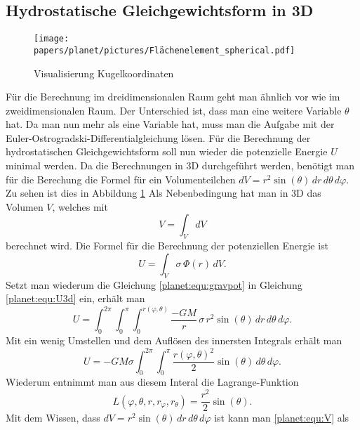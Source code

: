 \subsection{Hydrostatische Gleichgewichtsform in 3D}
\begin{figure}
	\centering
	\texttt{[image: papers/planet/pictures/Flächenelement\_spherical.pdf]}
	\caption{Visualisierung Kugelkoordinaten}
	\label{planet:fig:3d}
\end{figure}
Für die Berechnung im dreidimensionalen Raum geht man ähnlich vor wie im zweidimensionalen Raum.
Der Unterschied ist, dass man eine weitere Variable \(\theta\) hat.
Da man nun mehr als eine Variable hat, muss man die Aufgabe mit der Euler-Ostrogradski-Dif\-fe\-ren\-ti\-al\-glei\-chung lösen.
Für die Berechnung der hydrostatischen Gleichgewichtsform soll nun wieder die potenzielle Energie \(U\) minimal werden.
Da die Berechnungen in 3D durchgeführt werden, benötigt man für die Berechung die Formel für ein Volumenteilchen \(dV = r^2 \sin (\theta) \, dr \, d\theta \, d\varphi \).
Zu sehen ist dies in Abbildung \ref{planet:fig:3d}
Als Nebenbedingung hat man in 3D das Volumen \(V\), welches mit 
\begin{equation}
	V = \int_{V}^{} dV
	\label{planet:equ:V}
\end{equation}
berechnet wird.
Die Formel für die Berechnung der potenziellen Energie ist
\begin{equation}
	U = \int_{V} \sigma \,  \Phi (r)\, dV.
	\label{planet:equ:U3d}
\end{equation}
Setzt man wiederum die Gleichung \eqref{planet:equ:gravpot} in Gleichung \eqref{planet:equ:U3d} ein, erhält man
\begin{equation*}
	U = \int_{0}^{2\pi}
	\int_{0}^{\pi}
	\int_{0}^{r(\varphi,\theta)}
	\frac{-GM}{r}\, \sigma\, r^2 \sin (\theta) \,
	dr \, d\theta \, d\varphi.
\end{equation*}
Mit ein wenig Umstellen und dem Auflösen des innersten Integrals erhält man
\begin{equation*}
	U =-GM\sigma \int_{0}^{2\pi}\int_{0}^{\pi}\frac{r(\varphi,\theta)^2}{2}  \sin (\theta) \, d\theta \, d\varphi.
\end{equation*}
Wiederum entnimmt man aus diesem Interal die Lagrange-Funktion
\begin{equation*}
	L(\varphi,\theta ,r,r_\varphi,r_\theta) = \frac{r^2}{2}  \sin (\theta).
\end{equation*}
Mit dem Wissen, dass \(dV = r^2 \sin (\theta) \, dr \, d\theta \, d\varphi \) ist kann man \eqref{planet:equ:V} als
